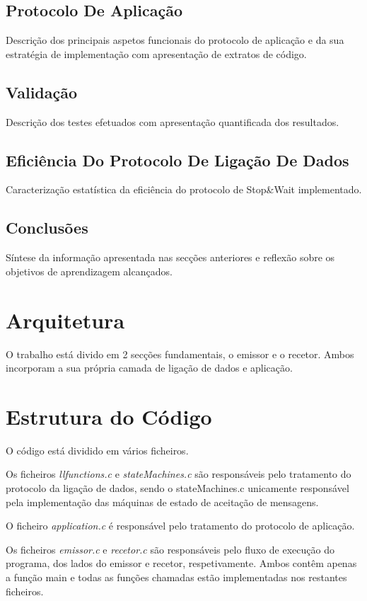 \documentclass{article}
\begin{document}
\subsection{Protocolo De Aplicação}
Descrição dos principais aspetos funcionais do protocolo de aplicação e da sua estratégia de implementação com apresentação de extratos de código.

\subsection{Validação}
Descrição dos testes efetuados com apresentação quantificada dos resultados.

\subsection{Eficiência Do Protocolo De Ligação De Dados}
Caracterização estatística da eficiência do protocolo de Stop\&Wait implementado.

\subsection{Conclusões}
Síntese da informação apresentada nas secções anteriores e reflexão sobre os objetivos de aprendizagem alcançados.


\section{Arquitetura}
O trabalho está divido em 2 secções fundamentais, o emissor e o recetor. Ambos incorporam a sua própria camada de ligação de dados e aplicação.

\section{Estrutura do Código}
O código está dividido em vários ficheiros.

Os ficheiros \textit{llfunctions.c} e \textit{stateMachines.c} são responsáveis pelo tratamento do protocolo da ligação de dados, sendo o  stateMachines.c unicamente responsável pela implementação das máquinas de estado de aceitação de mensagens.

O ficheiro \textit{application.c} é responsável pelo tratamento do protocolo de aplicação.

Os ficheiros \textit{emissor.c} e \textit{recetor.c} são responsáveis pelo fluxo de execução do programa, dos lados do emissor e recetor, respetivamente. Ambos contêm apenas a função main e todas as funções chamadas estão implementadas nos restantes ficheiros.
\end{document}
